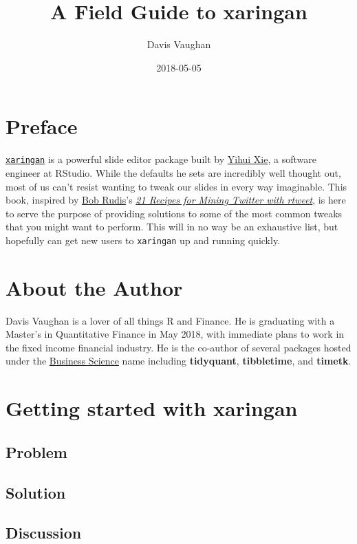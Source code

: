 \documentclass[]{book}
\title{A Field Guide to xaringan}
\author{Davis Vaughan}
\date{2018-05-05}
\theoremstyle{definition}
\theoremstyle{definition}
\theoremstyle{definition}
\theoremstyle{remark}
\begin{document}
\maketitle

{
\setcounter{tocdepth}{1}
\tableofcontents
}
\hypertarget{preface}{%
\chapter*{Preface}\label{preface}}

\href{https://github.com/yihui/xaringan}{\texttt{xaringan}} is a
powerful slide editor package built by
\href{https://github.com/yihui}{Yihui Xie}, a software engineer at
RStudio. While the defaults he sets are incredibly well thought out,
most of us can't resist wanting to tweak our slides in every way
imaginable. This book, inspired by
\href{https://twitter.com/hrbrmstr}{Bob Rudis}'s
\href{https://rud.is/books/21-recipes/index.html}{\emph{21 Recipes for
Mining Twitter with rtweet}}, is here to serve the purpose of providing
solutions to some of the most common tweaks that you might want to
perform. This will in no way be an exhaustive list, but hopefully can
get new users to \texttt{xaringan} up and running quickly.

\hypertarget{about-the-author}{%
\chapter*{About the Author}\label{about-the-author}}

Davis Vaughan is a lover of all things R and Finance. He is graduating
with a Master's in Quantitative Finance in May 2018, with immediate
plans to work in the fixed income financial industry. He is the
co-author of several packages hosted under the
\href{http://www.business-science.io/}{Business Science} name including
\textbf{tidyquant}, \textbf{tibbletime}, and \textbf{timetk}.

\hypertarget{getting-started-with-xaringan}{%
\chapter{Getting started with
xaringan}\label{getting-started-with-xaringan}}

\hypertarget{problem}{%
\section{Problem}\label{problem}}

\hypertarget{solution}{%
\section{Solution}\label{solution}}

\hypertarget{discussion}{%
\section{Discussion}\label{discussion}}


\end{document}
